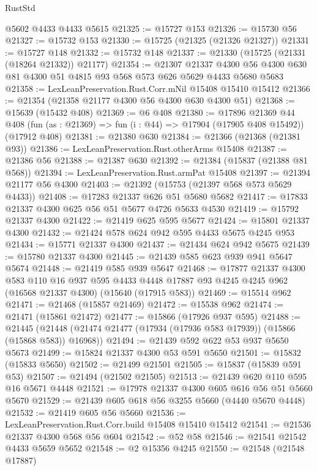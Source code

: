 \begin{lexlean}{RustStd}
\begin{coremodule}
{\begin{coremodule}
{{{{{{{{{{{{{{{{{{{{{{{{{{{{{{{{{{{{{{{{{{{{{{{{{{{{{{{{{{{{    @5602
    @4433
    @4433
    @5615
@21325 := @15727 @153
@21326 := @15730 @56
@21327 := @15732 @153
@21330 := @15725 (@21325 (@21326 @21327))
@21331 := @15727 @148
@21332 := @15732 @148
@21337 := @21330 (@15725 (@21331 (@18264 @21332)) @21177)
@21354 := @21307
    @21337
    @4300
    @56
    @4300
    @630
    @81
    @4300
    @51
    @4815
    @93
    @568
    @573
    @626
    @5629
    @4433
    @5680
    @5683
@21358 := LexLeanPreservation.Rust.Corr.mNil @15408 @15410 @15412
@21366 := @21354 (@21358 @21177 @4300 @56 @4300 @630 @4300 @51)
@21368 := @15639 (@15432 @408)
@21369 := @6 @408
@21380 := @17896
    @21369
    @44
    @408
    (fun (as : @21369) => fun (i : @44) => @17904 (@17905 @408 @15492))
    (@17912 @408)
@21381 := @21380 @630
@21384 := @21366 (@21368 (@21381 @93))
@21386 := LexLeanPreservation.Rust.otherArms @15408
@21387 := @21386 @56
@21388 := @21387 @630
@21392 := @21384 (@15837 (@21388 @81 @568))
@21394 := LexLeanPreservation.Rust.armPat @15408
@21397 := @21394 @21177 @56 @4300
@21403 := @21392 (@15753 (@21397 @568 @573 @5629 @4433))
@21408 := @17283 @21337 @626 @51 @5680 @5682
@21417 := @17833 @21337 @4300 @625 @56 @51 @5677 @4726 @5633 @4530
@21419 := @15792 @21337 @4300
@21422 := @21419 @625 @595 @5677
@21424 := @15801 @21337 @4300
@21432 := @21424 @578 @624 @942 @595 @4433 @5675 @4245 @953
@21434 := @15771 @21337 @4300
@21437 := @21434 @624 @942 @5675
@21439 := @15780 @21337 @4300
@21445 := @21439 @585 @623 @939 @941 @5647 @5674
@21448 := @21419 @585 @939 @5647
@21468 := @17877
    @21337
    @4300
    @583
    @110
    @16
    @937
    @595
    @4433
    @4448
    @17887
    @93
    @4245
    @4245
    @962
    (@16568 @21337 @4300)
    (@15640 (@17915 @583))
@21469 := @15514 @962
@21471 := @21468 (@15857 @21469)
@21472 := @15538 @962
@21474 := @21471 (@15861 @21472)
@21477 := @15866 (@17926 @937 @595)
@21488 := @21445
    (@21448 (@21474 @21477 (@17934 (@17936 @583 @17939)) (@15866 (@15868 @583)) @16968))
@21494 := @21439 @592 @622 @53 @937 @5650 @5673
@21499 := @15824 @21337 @4300 @53 @591 @5650
@21501 := @15832 (@15833 @5650)
@21502 := @21499 @21501
@21505 := @15837 (@15839 @591 @53)
@21507 := @21494 (@21502 @21505)
@21513 := @21439 @620 @110 @595 @16 @5671 @4448
@21521 := @17978 @21337 @4300 @605 @616 @56 @51 @5660 @5670
@21529 := @21439 @605 @618 @56 @3255 @5660 (@4440 @5670 @4448)
@21532 := @21419 @605 @56 @5660
@21536 := LexLeanPreservation.Rust.Corr.build @15408 @15410 @15412
@21541 := @21536 @21337 @4300 @568 @56 @604
@21542 := @52 @58
@21546 := @21541 @21542 @4433 @5659 @5652
@21548 := @2 @15356 @4245
@21550 := @21548 (@21548 @17887)
}}}}}}}}}}}}}}}}}}}}}}}}}}}}}}}}}}}}}}}}}}}}}}}}}}}}}}}}}}}}
\end{coremodule}}
\end{coremodule}
\end{lexlean}
